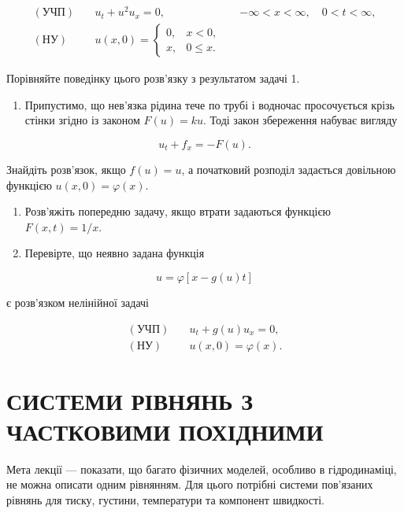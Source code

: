 \documentclass[
  ukrainian,
]{article}
\providecommand{\tightlist}{%
  \setlength{\itemsep}{0pt}\setlength{\parskip}{0pt}}
\begin{document}
\[
\begin{aligned}
(\text{УЧП})\quad & u_t + u^2 u_x = 0, && -\infty < x < \infty,\quad 0 < t < \infty, \\
(\text{НУ})\quad &
u(x,0)=
\begin{cases}
0, & x < 0,\\
x, & 0 \le x.
\end{cases}
\end{aligned}
\]

Порівняйте поведінку цього розв'язку з результатом задачі 1.

\begin{enumerate}
\def\labelenumi{\arabic{enumi}.}
\setcounter{enumi}{2}
\tightlist
\item
  Припустимо, що нев'язка рідина тече по трубі і водночас просочується
  крізь стінки згідно із законом \(F(u)=ku\). Тоді закон збереження
  набуває вигляду
\end{enumerate}

\[
u_t + f_x = -F(u).
\]

Знайдіть розв'язок, якщо \(f(u)=u\), а початковий розподіл задається
довільною функцією \(u(x,0)=\varphi(x)\).

\begin{enumerate}
\def\labelenumi{\arabic{enumi}.}
\setcounter{enumi}{3}
\item
  Розв'яжіть попередню задачу, якщо втрати задаються функцією
  \(F(x,t)=1/x\).
\item
  Перевірте, що неявно задана функція
\end{enumerate}

\[
u = \varphi[x-g(u)t]
\]

є розв'язком нелінійної задачі

\[
\begin{aligned}
(\text{УЧП})\quad & u_t + g(u)u_x = 0,\\
(\text{НУ})\quad & u(x,0)=\varphi(x).
\end{aligned}
\]

\section{СИСТЕМИ РІВНЯНЬ З ЧАСТКОВИМИ
ПОХІДНИМИ}\label{ux441ux438ux441ux442ux435ux43cux438-ux440ux456ux432ux43dux44fux43dux44c-ux437-ux447ux430ux441ux442ux43aux43eux432ux438ux43cux438-ux43fux43eux445ux456ux434ux43dux438ux43cux438}

Мета лекції --- показати, що багато фізичних моделей, особливо в
гідродинаміці, не можна описати одним рівнянням. Для цього потрібні
системи пов'язаних рівнянь для тиску, густини, температури та компонент
швидкості.
\end{document}
